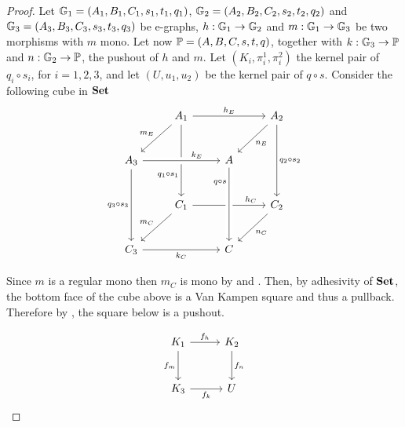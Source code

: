 \begin{proof}
	Let $\mathbb{G}_1 = (A_1, B_1, C_1, s_1, t_1, q_1)$, $\mathbb{G}_2 = (A_2, B_2, C_2, s_2, t_2, q_2)$ and $\mathbb{G}_3 = (A_3, B_3, C_3, s_3, t_3, q_3)$ be e-graphs,  $h: \mathbb{G}_1 \to \mathbb{G}_2$ and $m: \mathbb{G}_1 \to \mathbb{G}_3$ be two morphisms with $m$ mono. Let now $\mathbb{P} = (A, B, C, s, t, q)$, together with $k: \mathbb{G}_3 \to \mathbb{P}$ and $n: \mathbb{G}_2 \to \mathbb{P}$, the pushout of $h$ and $m$.
	Let $(K_i, \pi_i^1, \pi_i^2)$ the kernel pair of $q_i\circ s_i$, for $i = 1, 2, 3$, and let $(U, u_1, u_2)$ be the kernel pair of $q \circ s$.
	Consider the following cube in $\mathbf{Set}$
	\[\begin{tikzcd}[row sep=25, column sep = 25]
	& {A_1} && {A_2} \\
	{A_3} && A \\
	& {C_1} && {C_2} \\
	{C_3} && C
	\arrow["{h_E}", from=1-2, to=1-4]
	\arrow["{m_E}"', from=1-2, to=2-1]
	\arrow["{q_1\circ s_1}"'{pos=0.7}, from=1-2, to=3-2]
	\arrow["{n_E}", from=1-4, to=2-3]
	\arrow["{q_2\circ s_2}", from=1-4, to=3-4]
	\arrow["{k_E}"{pos=0.7}, from=2-1, to=2-3, crossing over]
	\arrow["{q_3\circ s_3}"', from=2-1, to=4-1]
	\arrow["{h_C}"{pos=0.8}, from=3-2, to=3-4]
	\arrow["{m_C}"', from=3-2, to=4-1]
	\arrow["{n_C}", from=3-4, to=4-3]
	\arrow["{k_C}"', from=4-1, to=4-3]
	\arrow["{q\circ s}"'{pos=0.2}, from=2-3, to=4-3, crossing over]
	\end{tikzcd}\]

	Since $m$ is a regular mono then $m_C$ is mono by  and . Then, by adhesivity of $\mathbf{Set}$, the bottom face of the cube above is a Van Kampen square and thus a pullback. Therefore by , the square below is a pushout.
	
	\[\begin{tikzcd}[row sep=27, column sep = 27]
		K_1 \ar[r, "{f_h}"] \ar[d, "{f_m}"swap] & K_2 \ar[d, "{f_n}"] \\
		K_3 \ar[r, "{f_k}"swap] & U
	\end{tikzcd}\]


\end{proof}
